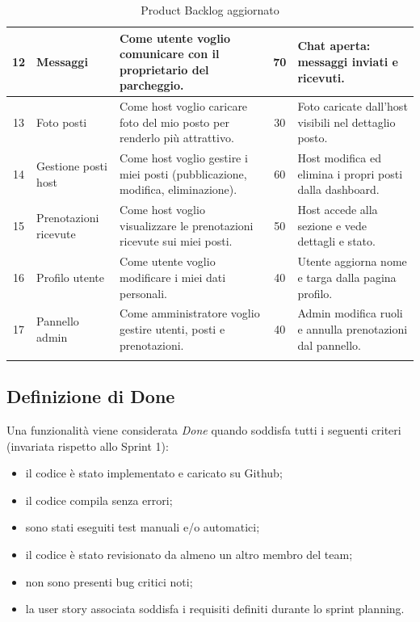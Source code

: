 \documentclass[a4paper,12pt]{article}
\begin{document}
\begin{longtable}{|c|l|p{4.5cm}|c|p{3cm}|}
\hline
12 & Messaggi              & Come utente voglio comunicare con il proprietario del parcheggio.                          & 70  & Chat aperta: messaggi inviati e ricevuti. \\
\hline
13 & Foto posti            & Come host voglio caricare foto del mio posto per renderlo più attrattivo.                  & 30  & Foto caricate dall'host visibili nel dettaglio posto. \\
\hline
14 & Gestione posti host   & Come host voglio gestire i miei posti (pubblicazione, modifica, eliminazione).             & 60  & Host modifica ed elimina i propri posti dalla dashboard. \\
\hline
15 & Prenotazioni ricevute & Come host voglio visualizzare le prenotazioni ricevute sui miei posti.                     & 50  & Host accede alla sezione e vede dettagli e stato. \\
\hline
16 & Profilo utente        & Come utente voglio modificare i miei dati personali.                                       & 40  & Utente aggiorna nome e targa dalla pagina profilo. \\
\hline
17 & Pannello admin        & Come amministratore voglio gestire utenti, posti e prenotazioni.                           & 40  & Admin modifica ruoli e annulla prenotazioni dal pannello. \\
\hline
\caption{Product Backlog aggiornato}
\end{longtable}

\subsection{Definizione di Done}

Una funzionalità viene considerata \textit{Done} quando soddisfa tutti i seguenti
criteri (invariata rispetto allo Sprint 1):

\begin{itemize}
  \item il codice è stato implementato e caricato su Github;
  \item il codice compila senza errori;
  \item sono stati eseguiti test manuali e/o automatici;
  \item il codice è stato revisionato da almeno un altro membro del team;
  \item non sono presenti bug critici noti;
  \item la user story associata soddisfa i requisiti definiti durante lo sprint planning.
\end{itemize}
\end{document}
